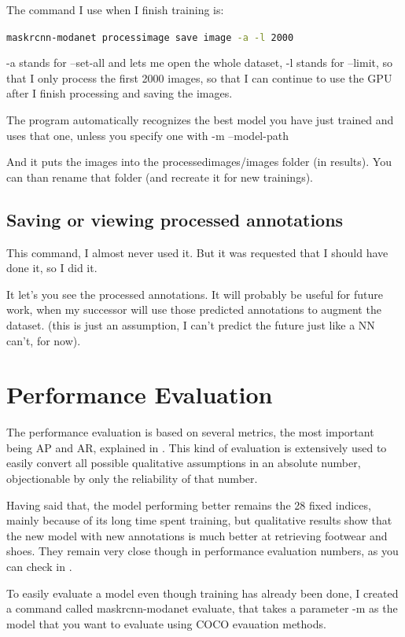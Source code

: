 The command I use when I finish training is:

\lstinline[language=bash]|maskrcnn-modanet processimage save image -a -l 2000|

-a stands for --set-all and lets me open the whole dataset, -l stands for --limit, so that I only process the first 2000 images, so that I can continue to use the GPU after I finish processing and saving the images.

The program automatically recognizes the best model you have just trained and uses that one, unless you specify one with -m --model-path

And it puts the images into the processedimages/images folder (in results). You can than rename that folder (and recreate it for new trainings).

\subsection{Saving or viewing processed annotations}

This command, I almost never used it. But it was requested that I should have done it, so I did it.

It let's you see the processed annotations. It will probably be useful for future work, when my successor will use those predicted annotations to augment the dataset. (this is just an assumption, I can't predict the future just like a NN can't, for now).

\section{Performance Evaluation}

The performance evaluation is based on several metrics, the most important being AP and AR, explained in . This kind of evaluation is extensively used to easily convert all possible qualitative assumptions in an absolute number, objectionable by only the reliability of that number.

Having said that, the model performing better remains the 28 fixed indices, mainly because of its long time spent training, but qualitative results show that the new model with new annotations is much better at retrieving footwear and shoes. They remain very close though in performance evaluation numbers, as you can check in .

To easily evaluate a model even though training has already been done, I created a command called maskrcnn-modanet evaluate, that takes a parameter -m as the model that you want to evaluate using COCO evauation methods.